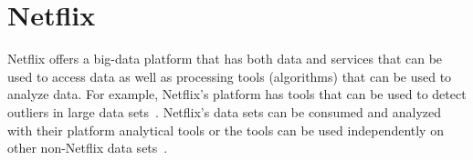 \section{Netflix}

Netflix offers a big-data platform that has both data and services that can be
used to access data as well as processing tools (algorithms) that can be used
to analyze data.  For example, Netflix's platform has tools that can be used to
detect outliers in large data sets~\cite{Wong2015}.  Netflix’s data sets can be
consumed and analyzed with their platform analytical tools or the tools can be
used independently on other non-Netflix data sets~\cite{Netflix2018}.
